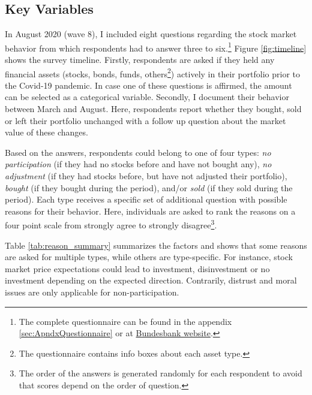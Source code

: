 \documentclass[ProjectABM]{subfiles}
\begin{document}
\subsection{Key Variables}
In August 2020 (wave 8), I included eight questions regarding the stock market behavior from which respondents had to answer three to six.\footnote{The complete questionnaire can be found in the appendix \ref{sec:ApndxQuestionnaire} or at \href{https://www.bundesbank.de/en/bundesbank/research/survey-on-consumer-expectations/questionnaires-850746}{Bundesbank website}.} Figure \ref{fig:timeline} shows the survey timeline. Firstly, respondents are asked if they held any financial assets (stocks, bonds, funds, others\footnote{The questionnaire contains info boxes about each asset type.}) actively in their portfolio prior to the Covid-19 pandemic. In case one of these questions is affirmed, the amount can be selected as a categorical variable. Secondly, I document their behavior between March and August. Here, respondents report whether they bought, sold or left their portfolio unchanged with a follow up question about the market value of these changes. %



Based on the answers, respondents could belong to one of four types: \textit{no participation} (if they had no stocks before and have not bought any), \textit{no adjustment} (if they had stocks before, but have not adjusted their portfolio), \textit{bought} (if they bought during the period), and/or \textit{sold} (if they sold during the period). Each type receives a specific set of additional question with possible reasons for their behavior. Here, individuals are asked to rank the reasons on a four point scale from strongly agree to strongly disagree\footnote{The order of the answers is generated randomly for each respondent to avoid that scores depend on the order of question.}.

Table \ref{tab:reason_summary} summarizes the factors and shows that some reasons are asked for multiple types, while others are type-specific. For instance, stock market price expectations could lead to investment, disinvestment or no investment depending on the expected direction. Contrarily, distrust and moral issues are only applicable for non-participation.
\end{document}
